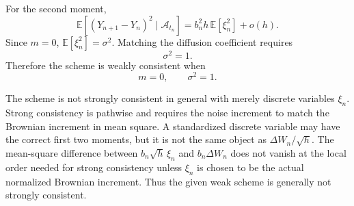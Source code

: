 \documentclass[11pt]{article}
\newcommand{\E}{\mathbb{E}}
\begin{document}
For the second moment,
\[
    \E\!\left[(Y_{n+1}-Y_n)^2\mid\mathcal A_{t_n}\right]
    =
    b_n^2 h\,\E[\xi_n^2]+o(h).
\]
Since $m=0$, $\E[\xi_n^2]=\sigma^2$. Matching the diffusion coefficient requires
\[
    \sigma^2=1.
\]
Therefore the scheme is weakly consistent when
\[
    \boxed{m=0,\qquad \sigma^2=1.}
\]

The scheme is not strongly consistent in general with merely discrete variables
$\xi_n$. Strong consistency is pathwise and requires the noise increment to match
the Brownian increment in mean square. A standardized discrete variable may have
the correct first two moments, but it is not the same object as
$\Delta W_n/\sqrt h$. The mean-square difference between
$b_n\sqrt h\,\xi_n$ and $b_n\Delta W_n$ does not vanish at the local order needed
for strong consistency unless $\xi_n$ is chosen to be the actual normalized
Brownian increment. Thus the given weak scheme is generally not strongly
consistent.
\end{document}
